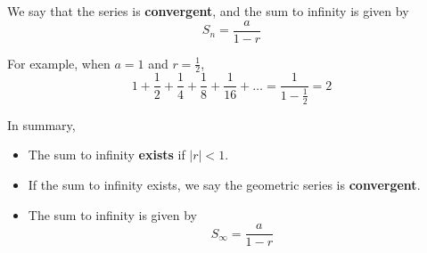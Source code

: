 \documentclass[11pt,a4paper]{book}
\begin{document}
We say that the series is \textbf{convergent}, and the sum to infinity
is given by 
\[
S_{n}=\frac{a}{1-r}
\]

For example, when $a=1$ and ${\displaystyle r=\frac{1}{2}}$, 
\[
{\displaystyle 1+\frac{1}{2}+\frac{1}{4}+\frac{1}{8}+\frac{1}{16}+\ldots=\frac{1}{1-\frac{1}{2}}=2}
\]

In summary,

\begin{tcolorbox}[colback=blue!5, colframe=black,boxrule=.4pt, sharpish corners]

\medskip{}

\begin{itemize}

\item The sum to infinity \textbf{exists} if $\left|r\right|<1$.

\medskip{}

\item If the sum to infinity exists, we say the geometric series
is \textbf{convergent}.

\medskip{}

\item The sum to infinity is given by 
\[
S_{\infty}=\frac{a}{1-r}
\]
\end{itemize}
\end{tcolorbox}

\newpage
\end{document}
